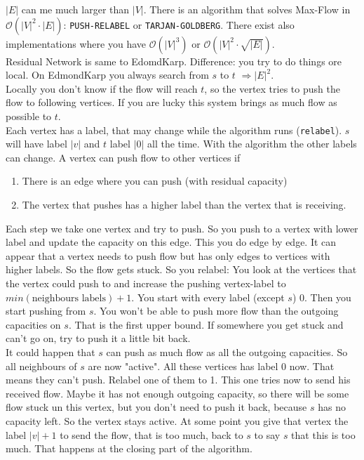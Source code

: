 $|E|$ can me much larger than $|V|$. There is an algorithm that solves Max-Flow in $\mathcal{O}(|V|^2 \cdot |E|)$: \texttt{PUSH-RELABEL} or \texttt{TARJAN-GOLDBERG}. There exist also implementations where you have $\mathcal{O}(|V|^3)$ or $\mathcal{O}(|V|^2\cdot \sqrt{|E|})$. \\
Residual Network is same to EdomdKarp. Difference: you try to do things ore local. On EdmondKarp you always search from $s$ to $t$ $\Rightarrow |E|^2$. \\
Locally you don't know if the flow will reach $t$, so the vertex tries to push the flow to following vertices. If you are lucky this system brings as much flow as possible to $t$. \\
Each vertex has a label, that may change while the algorithm runs (\texttt{relabel}). $s$ will have label $|v|$ and $t$ label $|0|$ all the time. With the algorithm the other labels can change. A vertex can push flow to other vertices if
\begin{enumerate}
	\item There is an edge where you can push (with residual capacity)
	\item The vertex that pushes has a higher label than the vertex that is receiving.
\end{enumerate}
Each step we take one vertex and try to push. So you push to a vertex with lower label and update the capacity on this edge. This you do edge by edge. It can appear that a vertex needs to push flow but has only edges to vertices with higher labels. So the flow gets stuck. So you relabel: You look at the vertices that the vertex could push to and increase the pushing vertex-label to $min(\text{neighbours labels})+1$. You start with every label (except $s$) 0. Then you start pushing from $s$. You won't be able to push more flow than the outgoing capacities on $s$. That is the first upper bound. If somewhere you get stuck and can't go on, try to push it a little bit back. \\
It could happen that $s$ can push as much flow as all the outgoing capacities. So all neighbours of $s$ are now "active". All these vertices has label 0 now. That means they can't push. Relabel one of them to 1. This one tries now to send his received flow. Maybe it has not enough outgoing capacity, so there will be some flow stuck un this vertex, but you don't need to push it back, because $s$ has no capacity left. So the vertex stays active. At some point you give that vertex the label $|v|+1$ to send the flow, that is too much, back to $s$ to say $s$ that this is too much. That happens at the closing part of the algorithm.

